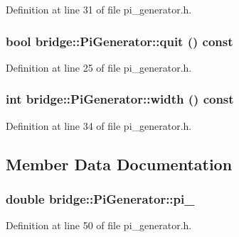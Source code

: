 Definition at line 31 of file pi\_\-generator.h.

\hypertarget{classbridge_1_1_pi_generator_a756bd50f86283c0970abbb1ce0d0a322}{
\subsubsection[{quit}]{\setlength{\rightskip}{0pt plus 5cm}bool bridge::PiGenerator::quit () const}}
\label{classbridge_1_1_pi_generator_a756bd50f86283c0970abbb1ce0d0a322}


Definition at line 25 of file pi\_\-generator.h.

\hypertarget{classbridge_1_1_pi_generator_ab96bd1df955862228ca1c2a42344debc}{
\subsubsection[{width}]{\setlength{\rightskip}{0pt plus 5cm}int bridge::PiGenerator::width () const}}
\label{classbridge_1_1_pi_generator_ab96bd1df955862228ca1c2a42344debc}


Definition at line 34 of file pi\_\-generator.h.



\subsection{Member Data Documentation}
\hypertarget{classbridge_1_1_pi_generator_a3d35a8b7e364db2572a1e3e983ff5053}{
\subsubsection[{pi\_\-}]{\setlength{\rightskip}{0pt plus 5cm}double {\bf bridge::PiGenerator::pi\_\-}}}
\label{classbridge_1_1_pi_generator_a3d35a8b7e364db2572a1e3e983ff5053}


Definition at line 50 of file pi\_\-generator.h.

